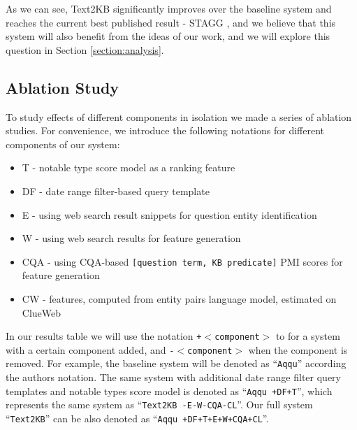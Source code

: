 As we can see, Text2KB significantly improves over the baseline system and reaches the current best published result - STAGG \cite{yih2015semantic}, and we believe that this system will also benefit from the ideas of our work, and we will explore this question in Section \ref{section:analysis}.

\subsection{Ablation Study}

To study effects of different components in isolation we made a series of ablation studies.
For convenience, we introduce the following notations for different components of our system:
\vspace{-0.1cm}
\begin{itemize}
\setlength\itemsep{-0.5em}
\item T - notable type score model as a ranking feature
\item DF - date range filter-based query template
\item E - using web search result snippets for question entity identification
\item W - using web search results for feature generation
\item CQA - using CQA-based \texttt{[question term, KB predicate]} PMI scores for feature generation
\item CW - features, computed from entity pairs language model, estimated on ClueWeb
\end{itemize}

In our results table we will use the notation \texttt{+$<$component$>$} to for a system with a certain component added, and \texttt{-$<$component$>$} when the component is removed.
For example, the baseline system will be denoted as ``\texttt{Aqqu}'' according the authors notation.
The same system with additional date range filter query templates and notable types score model is denoted as ``\texttt{Aqqu +DF+T}'', which represents the same system as ``\texttt{Text2KB -E-W-CQA-CL}''.
Our full system ``\texttt{Text2KB}'' can be also denoted as ``\texttt{Aqqu +DF+T+E+W+CQA+CL}''.

